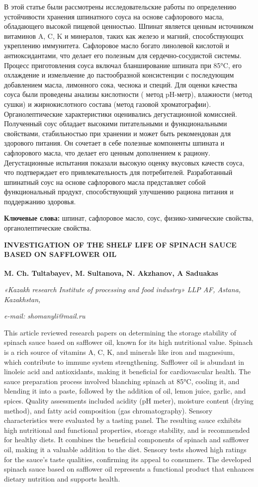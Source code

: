 {В этой статье были рассмотрены исследовательские работы по определению
устойчивости хранения шпинатного соуса на основе сафлорового масла,
обладающего высокой пищевой ценностью. Шпинат является ценным источником
витаминов A, C, K и минералов, таких как железо и магний, способствующих
укреплению иммунитета. Сафлоровое масло богато линолевой кислотой и
антиоксидантами, что делает его полезным для сердечно-сосудистой
системы. Процесс приготовления соуса включал бланширование шпината при
85°C, его охлаждение и измельчение до пастообразной консистенции с
последующим добавлением масла, лимонного сока, чеснока и специй. Для
оценки качества соуса были проведены анализы кислотности ( метод
pH-метр), влажности (метод сушки) и жирнокислотного состава (метод
газовой хроматографии). Органолептические характеристики оценивались
дегустационной комиссией. Полученный соус обладает высокими питательными
и функциональными свойствами, стабильностью при хранении и может быть
рекомендован для здорового питания. Он сочетает в себе полезные
компоненты шпината и сафлорового масла, что делает его ценным
дополнением к рациону. Дегустационные испытания показали высокую оценку
вкусовых качеств соуса, что подтверждает его привлекательность для
потребителей. Разработанный шпинатный соус на основе сафлорового масла
представляет собой функциональный продукт, способствующий улучшению
рациона питания и поддержанию здоровья.

{\bfseries Ключевые слова:} шпинат, сафлоровое масло, соус,
физико-химические свойства, органолептические свойства.

{\bfseries INVESTIGATION OF THE SHELF LIFE OF SPINACH SAUCE BASED ON
SAFFLOWER OIL}

{\bfseries \textsuperscript{\envelope }M. Ch. Tultabayev, M. Sultanova, N. Akzhanov,
A Saduakas}

\emph{«Kazakh research Institute of processing and food industry» LLP
AF, Astana, Kazakhstan,}

\emph{e-mail: shomanyli@mail.ru}

This article reviewed research papers on determining the storage
stability of spinach sauce based on safflower oil, known for its high
nutritional value. Spinach is a rich source of vitamins A, C, K, and
minerals like iron and magnesium, which contribute to immune system
strengthening. Safflower oil is abundant in linoleic acid and
antioxidants, making it beneficial for cardiovascular health. The sauce
preparation process involved blanching spinach at 85°C, cooling it, and
blending it into a paste, followed by the addition of oil, lemon juice,
garlic, and spices. Quality assessments included acidity (pH meter),
moisture content (drying method), and fatty acid composition (gas
chromatography). Sensory characteristics were evaluated by a tasting
panel. The resulting sauce exhibits high nutritional and functional
properties, storage stability, and is recommended for healthy diets. It
combines the beneficial components of spinach and safflower oil, making
it a valuable addition to the diet. Sensory tests showed high ratings
for the sauce's taste qualities, confirming its appeal to consumers. The
developed spinach sauce based on safflower oil represents a functional
product that enhances dietary nutrition and supports health.

}
